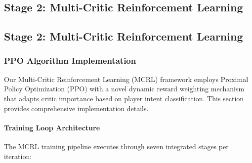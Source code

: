 \documentclass[11pt]{article}
\begin{document}
\subsection{Stage 2: Multi-Critic Reinforcement Learning}

\subsection{Stage 2: Multi-Critic Reinforcement Learning}

\subsubsection{PPO Algorithm Implementation}

Our Multi-Critic Reinforcement Learning (MCRL) framework employs Proximal Policy Optimization (PPO) \cite{schulman2017proximal} with a novel dynamic reward weighting mechanism that adapts critic importance based on player intent classification. This section provides comprehensive implementation details.

\paragraph{Training Loop Architecture}
The MCRL training pipeline executes through seven integrated stages per iteration:
\end{document}
